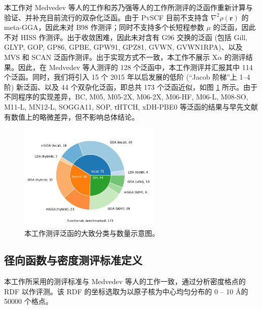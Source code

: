 本工作对 Medvedev 等人的工作\cite{Medvedev-Lyssenko.S.2017}和苏乃强等人的工作\cite{Su-Xu.PNAS.2018}所测评的泛函作重新计算与验证、并补充目前流行的双杂化泛函。由于 \textsc{PySCF} 目前不支持含 $\nabla^2 \rho(\bm{r})$ 的 meta-GGA，因此未对 B98 作测评；同时不支持多个长短程参数 $\mu$ 的泛函，因此不对 HISS 作测评。出于收敛困难，因此未对含有 G96 交换的泛函 (包括 Gill, GLYP, GOP, GP86, GPBE, GPW91, GPZ81, GVWN, GVWN1RPA)、以及 MVS 和 SCAN 泛函作测评。出于实现方式不一致，本工作不展示 X$\alpha$ 的测评结果。因此，在 Medvedev 等人测评的 128 个泛函中，本工作测评并汇报其中 114 个泛函。同时，我们将引入 15 个 2015 年以后发展的低阶 (“Jacob 阶梯”上 1--4 阶) 新泛函、以及 44 个双杂化泛函，即总共 173 个泛函近似，如图 \ref{fig.4.functionals-distribution} 所示。由于不同程序的实现差异，BC, M05, M05-2X, M06-2X, M06-HF, M06-L, M08-SO, M11-L, MN12-L, SOGGA11, SOP, τHTCH, xDH-PBE0 等泛函的结果与早先文献有数值上的略微差异，但不影响总体结论。

\begin{figure}[hp]
    \centering
    \includegraphics[width=0.6\textwidth]{assets/functionals-distribution.pdf}
    \caption[原子体系电子云密度与能量测评的泛函分类与数量示意]{本工作测评泛函的大致分类与数量示意图。}
    \label{fig.4.functionals-distribution}
\end{figure}

\subsection{径向函数与密度测评标准定义}

本工作所采用的测评标准与 Medvedev 等人的工作\cite{Medvedev-Lyssenko.S.2017}一致，通过分析密度格点的 RDF 以作评测。该 RDF 的坐标选取为以原子核为中心均匀分布的 0 -- 10 \AA 的 50000 个格点。

